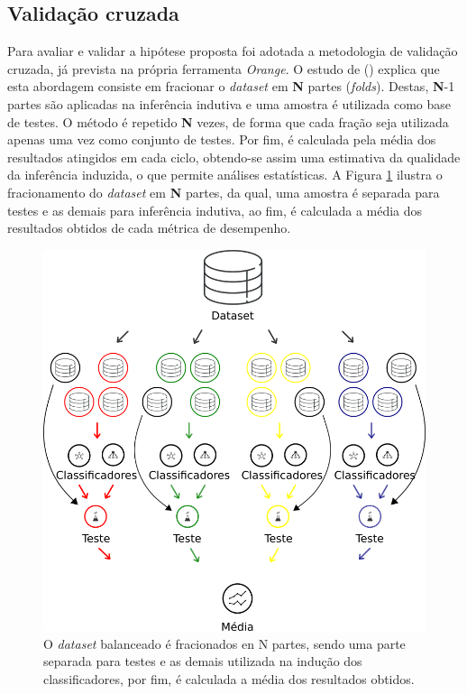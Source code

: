 \newpage
\subsection{Validação cruzada}
\label{subsection:validacao_cruzada}

Para avaliar e validar a hipótese proposta foi adotada a metodologia de 
validação cruzada, já prevista na própria ferramenta \textit{Orange}. O estudo 
de  (\citeyear{tavares2007estudo}) explica 
que esta abordagem consiste em fracionar o \textit{dataset} em \textbf{N} 
partes (\textit{folds}). Destas, \textbf{N}-1 partes são aplicadas na inferência 
indutiva e uma amostra é utilizada como base de testes. O método é repetido 
\textbf{N} vezes, de forma que cada fração seja utilizada apenas uma vez como
conjunto de testes. Por fim, é calculada pela média dos resultados atingidos em 
cada ciclo, obtendo-se assim uma estimativa da qualidade da inferência 
induzida, o que permite análises estatísticas. A Figura 
\ref{figure:metodologia_4} ilustra o fracionamento do \textit{dataset} em 
\textbf{N} partes, da qual, uma amostra é separada para testes e as demais para 
inferência indutiva, ao fim, é calculada a média dos resultados obtidos de 
cada métrica de desempenho. 

\begin{figure}[H]
\begin{center}
    \includegraphics[scale=0.50]{images/metodologia_4.png}
\end{center}
\caption{O \textit{dataset} balanceado é fracionados en N partes, sendo uma 
parte separada para testes e as demais utilizada na indução dos classificadores, 
por fim, é calculada a média dos resultados obtidos.}
\label{figure:metodologia_4}
\end{figure}